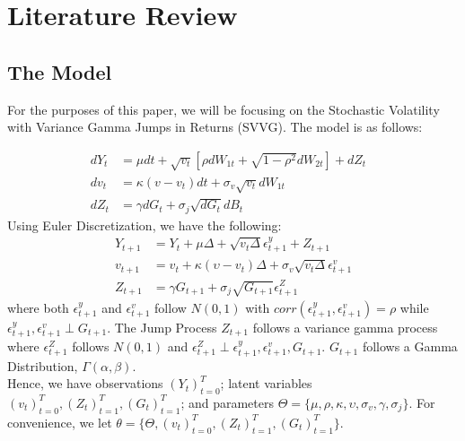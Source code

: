\documentclass[12pt]{article}
\theoremstyle{definition}
\begin{document}
\section{Literature Review}
\subsection{The Model}
For the purposes of this paper, we will be focusing on the Stochastic Volatility with Variance Gamma Jumps in Returns (SVVG). The model is as follows:

\begin{equation}
	\begin{aligned}
		dY_{t} &=\mu dt+\sqrt{v_{t}}[\rho dW_{1t}+\sqrt{1-\rho ^{2}} dW_{2t}] + dZ_{t} &\\
		dv_{t} &= \kappa (v - v_{t})dt+\sigma _{v}\sqrt{v_{t}}dW_{1t} &\\
		dZ_{t} &= \gamma dG_{t} + \sigma _{j} \sqrt{dG_{t}}dB_{t}
	\end{aligned}
\end{equation}
Using Euler Discretization, we have the following:
\begin{equation}
	\begin{aligned}
		Y_{t+1} &= Y_{t} + \mu\Delta + \sqrt{v_{t}\Delta}\epsilon_{t+1}^{y}+Z_{t+1}\\
		v_{t+1} &= v_{t} + \kappa(\upsilon - v_{t})\Delta + \sigma_{v}\sqrt{v_{t}\Delta}\epsilon_{t+1}^{v}\\
		Z_{t+1} &= \gamma G_{t+1} + \sigma_{j}\sqrt{G_{t+1}}\epsilon_{t+1}^{Z}
	\end{aligned}
\end{equation}
where both $\epsilon_{t+1}^{y}$ and $\epsilon_{t+1}^{v}$ follow $N(0,1)$ with $corr(\epsilon_{t+1}^{y},\epsilon_{t+1}^{v})=\rho$ while $\epsilon_{t+1}^{y},\epsilon_{t+1}^{v} \perp G_{t+1}$. The Jump Process $Z_{t+1}$ follows a variance gamma process where $\epsilon_{t+1}^{Z}$ follows $N(0,1)$ and $\epsilon_{t+1}^{Z} \perp \epsilon_{t+1}^{y},\epsilon_{t+1}^{v},G_{t+1}$. $G_{t+1}$ follows a Gamma Distribution, $\Gamma (\alpha,\beta)$.\\
Hence, we have observations $(Y_{t})_{t=0}^{T}$; latent variables $(v_{t})_{t=0}^{T},(Z_{t})_{t=1}^{T},(G_{t})_{t=1}^{T}$; and parameters $\Theta = \{\mu,\rho,\kappa,\upsilon,\sigma_{v},\gamma,\sigma_{j}\}$. For convenience, we let $\theta = \{\Theta,(v_{t})_{t=0}^{T},(Z_{t})_{t=1}^{T},(G_{t})_{t=1}^{T} \}$.
\end{document}
